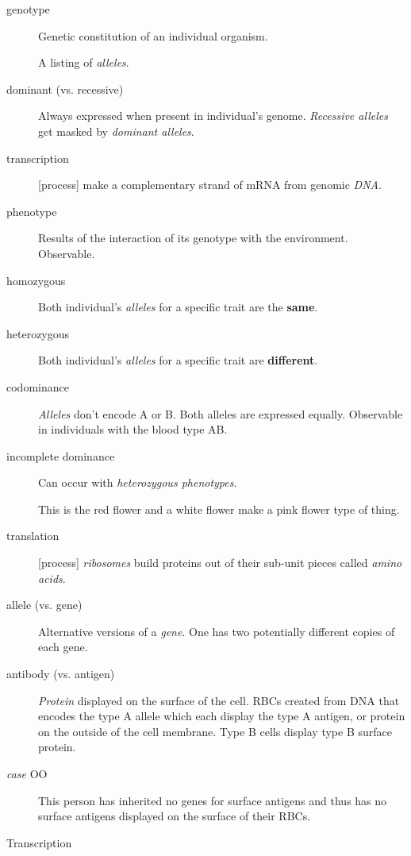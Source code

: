 \documentclass[11pt]{article}
\begin{document}
\begin{description}
\item[{genotype}] Genetic constitution of an individual organism.

A listing of \emph{alleles}.

\item[{dominant (vs. recessive)}] Always expressed when present in individual's
genome. \emph{Recessive alleles} get masked by \emph{dominant alleles}.

\item[{transcription}] [process] make a complementary strand of mRNA from
genomic \emph{DNA}.

\item[{phenotype}] Results of the interaction of its genotype with the
environment. Observable.

\item[{homozygous}] Both individual's \emph{alleles} for a specific trait are the
\textbf{same}.

\item[{heterozygous}] Both individual's \emph{alleles} for a specific trait are
\textbf{different}.

\item[{codominance}] \emph{Alleles} don't encode A or B. Both alleles are expressed
equally. Observable in individuals with the blood type AB.

\item[{incomplete dominance}] Can occur with \emph{heterozygous phenotypes}.

This is the red flower and a white flower make a pink flower type of
thing.

\item[{translation}] [process] \emph{ribosomes} build proteins out of their sub-unit
pieces called \emph{amino acids}.

\item[{allele (vs. gene)}] Alternative versions of a \emph{gene}. One has two
potentially different copies of each gene.
\item[{antibody (vs. antigen)}] \emph{Protein} displayed on the surface of the cell.
RBCs created from DNA that encodes the type A allele which each display
the type A antigen, or protein on the outside of the cell membrane.
Type B cells display type B surface protein.
\item[{\emph{case} OO}] This person has inherited no genes for surface antigens and
thus has no surface antigens displayed on the surface of their RBCs.
\item[{Transcription}] 


\end{description}
\end{document}

